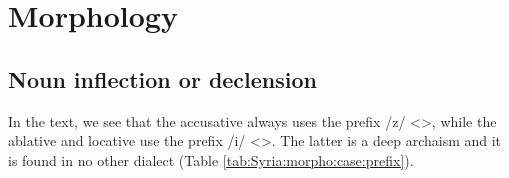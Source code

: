 \section{Morphology}
\subsection{Noun inflection or declension}


In the text, we see that the accusative always uses the prefix /z/ <>, while the ablative and locative use the prefix /i/ <>. The latter is a deep archaism and it is found in no other dialect (Table \ref{tab:Syria:morpho:case:prefix}). 



